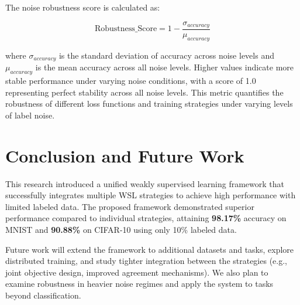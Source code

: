 \documentclass{ieeeaccess}
\begin{document}
The noise robustness score is calculated as:

\begin{equation}
\text{Robustness\_Score} = 1 - \frac{\sigma_{accuracy}}{\mu_{accuracy}}
\label{eq:robustness_score}
\end{equation}

where $\sigma_{accuracy}$ is the standard deviation of accuracy across noise levels and $\mu_{accuracy}$ is the mean accuracy across all noise levels. Higher values indicate more stable performance under varying noise conditions, with a score of 1.0 representing perfect stability across all noise levels. This metric quantifies the robustness of different loss functions and training strategies under varying levels of label noise.

\section{Conclusion and Future Work}
\label{sec:conclusion}

This research introduced a unified weakly supervised learning framework that successfully integrates multiple WSL strategies to achieve high performance with limited labeled data. The proposed framework demonstrated superior performance compared to individual strategies, attaining \textbf{98.17\%} accuracy on MNIST and \textbf{90.88\%} on CIFAR-10 using only 10\% labeled data.

Future work will extend the framework to additional datasets and tasks, explore distributed training, and study tighter integration between the strategies (e.g., joint objective design, improved agreement mechanisms). We also plan to examine robustness in heavier noise regimes and apply the system to tasks beyond classification.
\end{document}
